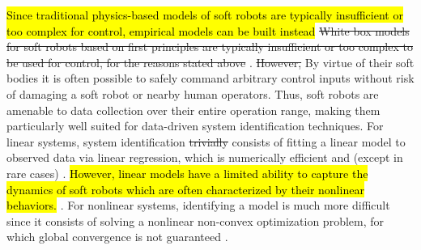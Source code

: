 \hl{Since traditional physics-based models of soft robots are typically insufficient or too complex for control, empirical models can be built instead}
\sout{White box models  for soft robots based on first principles are typically insufficient or too complex to be used for control, for the reasons stated above} . 
\sout{However,} By virtue of their soft bodies it is often possible to safely command arbitrary control inputs without risk of damaging a soft robot or nearby human operators.
Thus, soft robots are amenable to data collection over their entire operation range, making them particularly well suited for data-driven system identification techniques.
For linear systems, system identification \sout{trivially}  consists of fitting a linear model to observed data via linear regression, which is numerically efficient and  (except in rare cases) .
\hl{However, linear models have a limited ability to capture the dynamics of soft robots which are often characterized by their nonlinear behaviors.}
.
For nonlinear systems, identifying a model is much more difficult since it consists of solving a nonlinear non-convex optimization problem, for which global convergence is not guaranteed .

